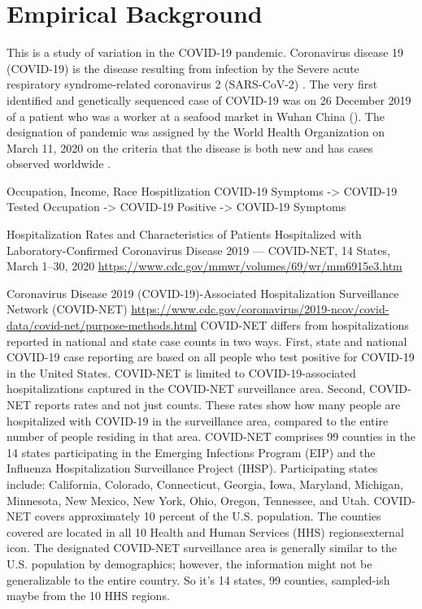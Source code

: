 \documentclass[
]{book}
\begin{document}
\hypertarget{empirical-background}{%
\chapter{Empirical Background}\label{empirical-background}}

This is a study of variation in the COVID-19 pandemic. Coronavirus disease 19 (COVID-19) is the disease resulting from infection by the Severe acute respiratory syndrome-related coronavirus 2 (SARS-CoV-2) \citep{gorbalenyaSpeciesSevereAcute2020}. The very first identified and genetically sequenced case of COVID-19 was on 26 December 2019 of a patient who was a worker at a seafood market in Wuhan China (\citet{NovelCoronavirusPatients}). The designation of pandemic was assigned by the World Health Organization on March 11, 2020 on the criteria that the disease is both new and has cases observed worldwide \citep{WHOWhatPandemic}.

Occupation, Income, Race
Hospitlization COVID-19 Symptoms -\textgreater{} COVID-19 Tested
Occupation -\textgreater{} COVID-19 Positive -\textgreater{} COVID-19 Symptoms

Hospitalization Rates and Characteristics of Patients Hospitalized with Laboratory-Confirmed Coronavirus Disease 2019 --- COVID-NET, 14 States, March 1--30, 2020
\url{https://www.cdc.gov/mmwr/volumes/69/wr/mm6915e3.htm}
\citep{gargHospitalizationRatesCharacteristics2020}

Coronavirus Disease 2019 (COVID-19)-Associated Hospitalization Surveillance Network (COVID-NET)
\url{https://www.cdc.gov/coronavirus/2019-ncov/covid-data/covid-net/purpose-methods.html}
COVID-NET differs from hospitalizations reported in national and state case counts in two ways. First, state and national COVID-19 case reporting are based on all people who test positive for COVID-19 in the United States. COVID-NET is limited to COVID-19-associated hospitalizations captured in the COVID-NET surveillance area. Second, COVID-NET reports rates and not just counts. These rates show how many people are hospitalized with COVID-19 in the surveillance area, compared to the entire number of people residing in that area.
COVID-NET comprises 99 counties in the 14 states participating in the Emerging Infections Program (EIP) and the Influenza Hospitalization Surveillance Project (IHSP). Participating states include: California, Colorado, Connecticut, Georgia, Iowa, Maryland, Michigan, Minnesota, New Mexico, New York, Ohio, Oregon, Tennessee, and Utah.
COVID-NET covers approximately 10 percent of the U.S. population. The counties covered are located in all 10 Health and Human Services (HHS) regionsexternal icon. The designated COVID-NET surveillance area is generally similar to the U.S. population by demographics; however, the information might not be generalizable to the entire country.
So it's 14 states, 99 counties, sampled-ish maybe from the 10 HHS regions.
\end{document}
